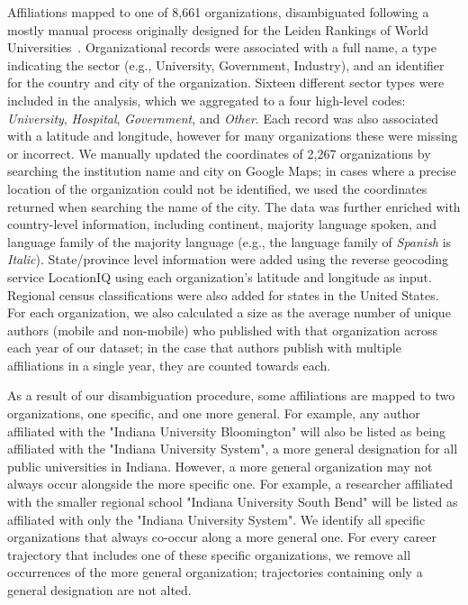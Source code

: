 \documentclass[12pt]{article} %
\begin{document}
Affiliations mapped to one of 8,661 organizations, disambiguated following a mostly manual process originally designed for the Leiden Rankings of World Universities~\cite{waltman2012leidenrankings}. 
Organizational records were associated with a full name, a type indicating the sector (e.g., University, Government, Industry), and an identifier for the country and city of the organization. 
Sixteen different sector types were included in the analysis, which we aggregated to a four high-level codes: \textit{University}, \textit{Hospital}, \textit{Government}, and \textit{Other}. 
Each record was also associated with a latitude and longitude, however for many organizations these were missing or incorrect. We manually updated the coordinates of 2,267 organizations by searching the institution name and city on Google Maps;
in cases where a precise location of the organization could not be identified, we used the coordinates returned when searching the name of the city.
The data was further enriched with country-level information, including continent, majority language spoken, and language family of the majority language (e.g., the language family of \textit{Spanish} is \textit{Italic}).  
State/province level  information were added using the reverse geocoding service LocationIQ using each organization's latitude and longitude as input. 
Regional census classifications were also added for states in the United States.
For each organization, we also calculated a size as the average number of unique authors (mobile and non-mobile) who published with that organization across each year of our dataset;
in the case that authors publish with multiple affiliations in a single year, they are counted towards each. 

As a result of our disambiguation procedure, some affiliations are mapped to two organizations, one specific, and one more general.
For example, any author affiliated with the "Indiana University Bloomington" will also be listed as being affiliated with the "Indiana University System", a more general designation for all public universities in Indiana. 
However, a more general organization may not always occur alongside the more specific one.
For example, a researcher affiliated with the smaller regional school "Indiana University South Bend" will be listed as affiliated with only the "Indiana University System". 
We identify all specific organizations that always co-occur along a more general one.
For every career trajectory that includes one of these specific organizations, we remove all occurrences of the more general organization;
trajectories containing only a general designation are not alted. 
\end{document}
